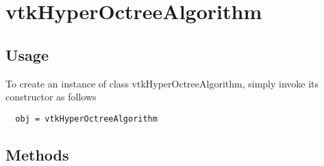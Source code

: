 \section{vtkHyperOctreeAlgorithm}

\subsection{Usage}


To create an instance of class vtkHyperOctreeAlgorithm, simply
invoke its constructor as follows
\begin{verbatim}
  obj = vtkHyperOctreeAlgorithm
\end{verbatim}
\subsection{Methods}

